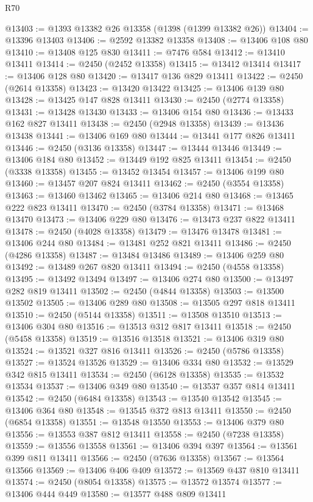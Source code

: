 \begin{lexlean}{R70}
\begin{coremodule}
@13403 := @1393 @13382 @26 @13358 (@1398 (@1399 @13382 @26))
@13404 := @13396 @13403
@13406 := @2592 @13382 @13358
@13408 := @13406 @108 @80
@13410 := @13408 @125 @830
@13411 := @7476 @584
@13412 := @13410 @13411
@13414 := @2450 (@2452 @13358)
@13415 := @13412 @13414
@13417 := @13406 @128 @80
@13420 := @13417 @136 @829 @13411
@13422 := @2450 (@2614 @13358)
@13423 := @13420 @13422
@13425 := @13406 @139 @80
@13428 := @13425 @147 @828 @13411
@13430 := @2450 (@2774 @13358)
@13431 := @13428 @13430
@13433 := @13406 @154 @80
@13436 := @13433 @162 @827 @13411
@13438 := @2450 (@2948 @13358)
@13439 := @13436 @13438
@13441 := @13406 @169 @80
@13444 := @13441 @177 @826 @13411
@13446 := @2450 (@3136 @13358)
@13447 := @13444 @13446
@13449 := @13406 @184 @80
@13452 := @13449 @192 @825 @13411
@13454 := @2450 (@3338 @13358)
@13455 := @13452 @13454
@13457 := @13406 @199 @80
@13460 := @13457 @207 @824 @13411
@13462 := @2450 (@3554 @13358)
@13463 := @13460 @13462
@13465 := @13406 @214 @80
@13468 := @13465 @222 @823 @13411
@13470 := @2450 (@3784 @13358)
@13471 := @13468 @13470
@13473 := @13406 @229 @80
@13476 := @13473 @237 @822 @13411
@13478 := @2450 (@4028 @13358)
@13479 := @13476 @13478
@13481 := @13406 @244 @80
@13484 := @13481 @252 @821 @13411
@13486 := @2450 (@4286 @13358)
@13487 := @13484 @13486
@13489 := @13406 @259 @80
@13492 := @13489 @267 @820 @13411
@13494 := @2450 (@4558 @13358)
@13495 := @13492 @13494
@13497 := @13406 @274 @80
@13500 := @13497 @282 @819 @13411
@13502 := @2450 (@4844 @13358)
@13503 := @13500 @13502
@13505 := @13406 @289 @80
@13508 := @13505 @297 @818 @13411
@13510 := @2450 (@5144 @13358)
@13511 := @13508 @13510
@13513 := @13406 @304 @80
@13516 := @13513 @312 @817 @13411
@13518 := @2450 (@5458 @13358)
@13519 := @13516 @13518
@13521 := @13406 @319 @80
@13524 := @13521 @327 @816 @13411
@13526 := @2450 (@5786 @13358)
@13527 := @13524 @13526
@13529 := @13406 @334 @80
@13532 := @13529 @342 @815 @13411
@13534 := @2450 (@6128 @13358)
@13535 := @13532 @13534
@13537 := @13406 @349 @80
@13540 := @13537 @357 @814 @13411
@13542 := @2450 (@6484 @13358)
@13543 := @13540 @13542
@13545 := @13406 @364 @80
@13548 := @13545 @372 @813 @13411
@13550 := @2450 (@6854 @13358)
@13551 := @13548 @13550
@13553 := @13406 @379 @80
@13556 := @13553 @387 @812 @13411
@13558 := @2450 (@7238 @13358)
@13559 := @13556 @13558
@13561 := @13406 @394 @397
@13564 := @13561 @399 @811 @13411
@13566 := @2450 (@7636 @13358)
@13567 := @13564 @13566
@13569 := @13406 @406 @409
@13572 := @13569 @437 @810 @13411
@13574 := @2450 (@8054 @13358)
@13575 := @13572 @13574
@13577 := @13406 @444 @449
@13580 := @13577 @488 @809 @13411

\end{coremodule}
\end{lexlean}
